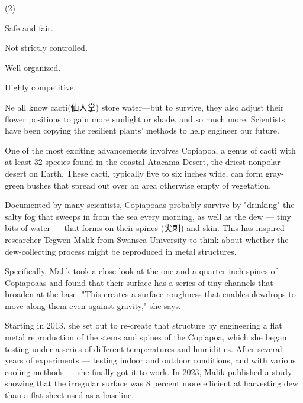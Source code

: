 \documentclass{英语试卷}
\begin{document}
\begin{choices}(2)
  \item Safe and fair.
  \item Not strictly controlled.
  \item Well-organized.
  \item Highly competitive.
\end{choices}
\par Ne all know cacti(仙人掌) store water—but to survive, they also adjust their flower positions to gain more sunlight or shade, and so much more. Scientists have been copying the resilient plants' methods to help engineer our future.\par
\par One of the most exciting advancements involves Copiapoa, a genus of cacti with at least 32 species found in the coastal Atacama Desert, the driest nonpolar desert on Earth. These cacti, typically five to six inches wide, can form gray-green bushes that spread out over an area otherwise empty of vegetation.\par
\par Documented by many scientists, Copiapoaas probably survive by "drinking" the salty fog that sweeps in from the sea every morning, as well as the dew — tiny bits of water — that forms on their spines (尖刺) and skin. This has inspired researcher Tegwen Malik from Swansea University to think about whether the dew-collecting process might be reproduced in metal structures.\par
\par Specifically, Malik took a close look at the one-and-a-quarter-inch spines of Copiapoaas and found that their surface has a series of tiny channels that broaden at the base. "This creates a surface roughness that enables dewdrops to move along them even against gravity," she says.\par
\par Starting in 2013, she set out to re-create that structure by engineering a flat metal reproduction of the stems and spines of the Copiapoa, which she began testing under a series of different temperatures and humidities. After several years of experiments — testing indoor and outdoor conditions, and with various cooling methods — she finally got it to work. In 2023, Malik published a study showing that the irregular surface was 8 percent more efficient at harvesting dew than a flat sheet used as a baseline.\par
\end{document}
